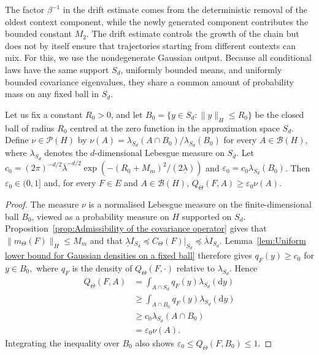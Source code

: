 The factor \(\beta^{-1}\) in the drift estimate comes from the deterministic removal of the oldest context component, while the newly generated component contributes the bounded constant \(M_2\). The drift estimate controls the growth of the chain but does not by itself ensure that trajectories starting from different contexts can mix. For this, we use the nondegenerate Gaussian output. Because all conditional laws have the same support \(S_d\), uniformly bounded means, and uniformly bounded covariance eigenvalues, they share a common amount of probability mass on any fixed ball in \(S_d\).

\begin{proposition}\label{prop:Uniform minorisation of the output kernel}
Let us fix a constant \(R_0>0\), and let \(B_0=\{y\in S_d:\|y\|_H\leqslant R_0\}\) be the closed ball of radius \(R_0\) centred at the zero function in the approximation space \(S_d\). Define \(\nu\in\mathcal P(H)\) by \(\nu(A)=\lambda_{S_d}(A\cap B_0)/\lambda_{S_d}(B_0)\) for every \(A\in\mathcal B(H)\), where \(\lambda_{S_d}\) denotes the \(d\)-dimensional Lebesgue measure on \(S_d\). Let \(c_0=(2\pi)^{-d/2}\overline\lambda^{-d/2}\exp\!\left(-(R_0+M_m)^2/(2\underline\lambda)\right)\) and \(\varepsilon_0=c_0\lambda_{S_d}(B_0)\). Then \(\varepsilon_0\in(0,1]\) and, for every \(F\in E\) and \(A\in\mathcal B(H)\), \(Q_\Theta(F,A)\geqslant\varepsilon_0\nu(A)\).
\end{proposition}

\begin{proof}
The measure \(\nu\) is a normalised Lebesgue measure on the finite-dimensional ball \(B_0\), viewed as a probability measure on \(H\) supported on \(S_d\). Proposition~\ref{prop:Admissibility of the covariance operator} gives that
\(
\|m_\Theta(F)\|_H\leqslant M_m
\) and that
\(
\underline\lambda I_{S_d}\preceq C_\Theta(F)|_{S_d}
\preceq\overline\lambda I_{S_d}.
\)
Lemma~\ref{lem:Uniform lower bound for Gaussian densities on a fixed ball} therefore gives
\(
q_F(y)\geqslant c_0\) for \( y\in B_0,
\)
where \(q_F\) is the density of \(Q_\Theta(F,\cdot)\) relative to \(\lambda_{S_d}\). Hence
\[
\begin{aligned}
Q_\Theta(F,A)
&=\int_{A\cap S_d}q_F(y)\lambda_{S_d}(\mathrm dy)\\
&\geqslant\int_{A\cap B_0}q_F(y)\lambda_{S_d}(\mathrm dy)\\
&\geqslant c_0\lambda_{S_d}(A\cap B_0)\\
&=\varepsilon_0\nu(A).
\end{aligned}
\]
Integrating the inequality over \(B_0\) also shows \(\varepsilon_0\leqslant Q_\Theta(F,B_0)\leqslant1\).
\end{proof}

